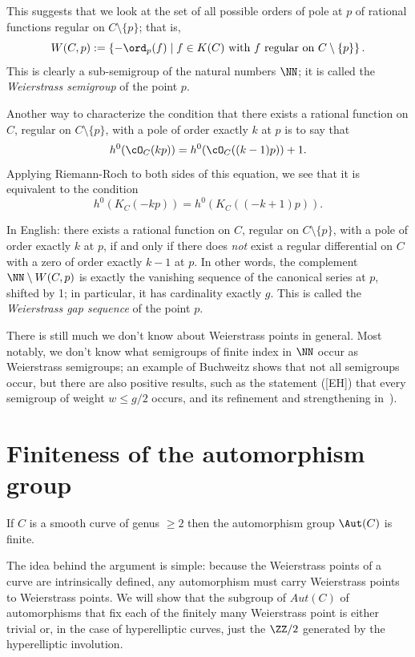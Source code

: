 This suggests that we look at the set of all possible orders of pole at $p$ of rational functions regular on $C \setminus \{p\}$; that is,
$$
W(C,p) := \left\{ -\ord_p(f) \mid f \in K(C) \text{ with $f$ regular on } C \setminus \{p\} \right\}.
$$
This is clearly a sub-semigroup of the natural numbers $\NN$; it is called the \emph{Weierstrass semigroup} of the point $p$.  

Another way to characterize the condition that there exists a rational function on $C$, regular on $C \setminus \{p\}$, with a pole of order exactly $k$ at $p$ is to say that
$$
h^0(\cO_C(kp)) = h^0(\cO_C((k-1)p)) + 1.
$$
Applying Riemann-Roch to both sides of this equation, we see that it is equivalent to the condition
$$
h^0(K_C(-kp)) = h^0(K_C((-k+1)p)).
$$

In English: there exists a rational function on $C$, regular on $C \setminus \{p\}$, with a pole of order exactly $k$ at $p$, if and only if there does \emph{not} exist a regular differential on $C$ with a zero of order exactly $k-1$ at $p$.
 In other words, the complement $\NN \setminus W(C,p)$ is exactly the vanishing sequence of the canonical series at $p$, shifted by 1; in particular, it has cardinality  exactly $g$. This is called the \emph{Weierstrass gap sequence} of the point $p$.

There is still much we don't know about Weierstrass points in general. Most notably, we don't know what semigroups of finite index in $\NN$ occur as Weierstrass semigroups; an example of Buchweitz shows that not all semigroups occur, but there are also positive results, such as the statement ([EH]) that every semigroup of weight $w \leq g/2$ occurs, and its refinement and strengthening in~\cite{MR3892968}).


\section{Finiteness of the automorphism group}\label{finiteness section}


\begin{theorem}\label{finite autos}
If $C$ is a smooth curve of genus $\geq 2$ then the automorphism group $\Aut(C)$ is finite.
\end{theorem}

  The idea behind the argument is simple: because the Weierstrass points of a curve are intrinsically defined, any automorphism must carry Weierstrass points to Weierstrass points. We will show that the subgroup of $Aut(C)$ of automorphisms that fix each  of the finitely many Weierstrass point is either
 trivial or, in the case of hyperelliptic curves, just the $\ZZ/2$ generated by the hyperelliptic involution.
    
